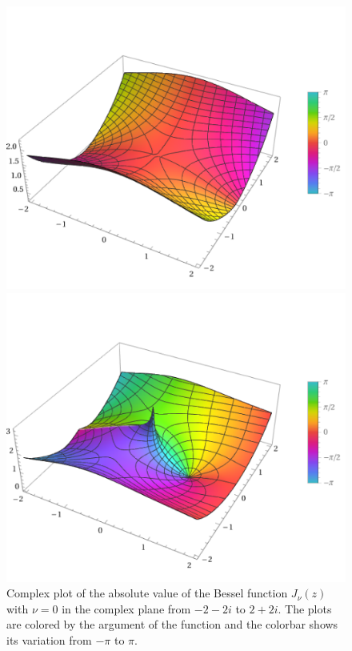 \begin{figure}[!htb]
    \centering
    \begin{minipage}{.5\textwidth}
        \centering
        \includegraphics[width=\linewidth]{Images/Bessel/bessel_j_0_z.png}
        \captionsetup{width=0.9\linewidth} %
        \caption{Complex plot of the absolute value of the Bessel function \(J_\nu(z)\) with \(\nu=0\) in the complex plane from \(-2-2i\) to \(2+2i\). The plots are colored by the argument of the function and the colorbar shows its variation from \(-\pi\) to \(\pi\).}
        \label{bessel_function_j_complex_plot}
    \end{minipage}%
    \begin{minipage}{.5\textwidth}
        \centering
        \includegraphics[width=\linewidth]{Images/Bessel/bessel_y_0_z.png}

\end{minipage}
\end{figure}
